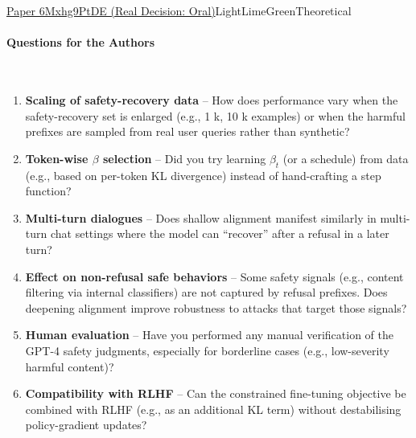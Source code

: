 \documentclass{article} %
\begin{document}
\begin{reviewbox}{\href{https://openreview.net/forum?id=6Mxhg9PtDE}{Paper 6Mxhg9PtDE (Real Decision: Oral)}}{LightLimeGreen}{Theoretical}
\paragraph{Questions for the Authors}\leavevmode\\[0.1em]
\begin{enumerate}[leftmargin=0.5em, itemsep=0pt, topsep=0pt]
    \item \textbf{Scaling of safety-recovery data} – How does performance vary when the safety-recovery set is enlarged (e.g., 1 k, 10 k examples) or when the harmful prefixes are sampled from real user queries rather than synthetic?
    \item \textbf{Token-wise $\beta$ selection} – Did you try learning $\beta_t$ (or a schedule) from data (e.g., based on per-token KL divergence) instead of hand-crafting a step function?
    \item \textbf{Multi-turn dialogues} – Does shallow alignment manifest similarly in multi-turn chat settings where the model can “recover” after a refusal in a later turn?
    \item \textbf{Effect on non-refusal safe behaviors} – Some safety signals (e.g., content filtering via internal classifiers) are not captured by refusal prefixes. Does deepening alignment improve robustness to attacks that target those signals?
    \item \textbf{Human evaluation} – Have you performed any manual verification of the GPT-4 safety judgments, especially for borderline cases (e.g., low-severity harmful content)?
    \item \textbf{Compatibility with RLHF} – Can the constrained fine-tuning objective be combined with RLHF (e.g., as an additional KL term) without destabilising policy-gradient updates?
\end{enumerate}


\end{reviewbox}
\end{document}
